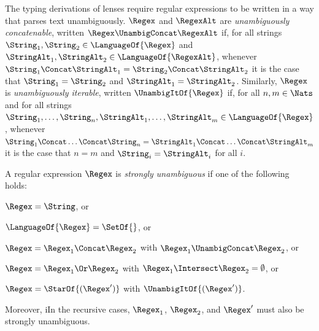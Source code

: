 \documentclass[sigplan,acmsmall]{acmart}
\begin{document}
The typing derivations of lenses require regular expressions to be written in a
way that parses text unambiguously. $\Regex$ and $\RegexAlt$ are
\textit{unambiguously concatenable}, written
$\Regex\UnambigConcat\RegexAlt$ if, 
for all strings $\String_1,\String_2\in\LanguageOf{\Regex}$ and
$\StringAlt_1,\StringAlt_2\in\LanguageOf{\RegexAlt}$, whenever
$\String_1\Concat\StringAlt_1=\String_2\Concat\StringAlt_2$ it is the case that
$\String_1=\String_2$ and $\StringAlt_1=\StringAlt_2$.
%
Similarly, $\Regex$ is \textit{unambiguously iterable},
written $\UnambigItOf{\Regex}$ if,
for all $n,m\in\Nats$ and for all strings
$\String_1,\ldots,\String_n,\StringAlt_1,\ldots,\StringAlt_m\in\LanguageOf{\Regex}$,
whenever
$\String_1\Concat\ldots\Concat\String_n=\StringAlt_1\Concat\ldots\Concat\StringAlt_m$
it is the case that $n=m$ and $\String_i=\StringAlt_i$ for all $i$.

A regular expression $\Regex$ is \textit{strongly unambiguous} if one
of the following holds: 
\begin{enumerate*}[label=(\alph*) ]
\item $\Regex = \String$,  or
\item $\LanguageOf{\Regex} = \SetOf{}$, or 
\item $\Regex = \Regex_1 \Concat \Regex_2$ with $\Regex_1 \UnambigConcat
  \Regex_2$, or
\item $\Regex = \Regex_1 \Or \Regex_2$ with $\Regex_1 \Intersect \Regex_2 =
  \emptyset$, 
or
\item $\Regex = \StarOf{(\Regex')}$ with $\UnambigItOf{(\Regex')}$.
\end{enumerate*}
\iffull Moreover, i\else I\fi{}n the recursive cases, $\Regex_1$, $\Regex_2$, and $\Regex'$
must also be strongly unambiguous.


\end{document}
